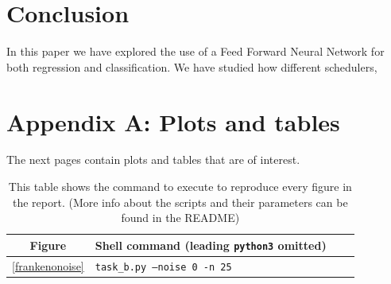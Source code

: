 \documentclass[onecolumn,10pt,cleanfoot]{asme2ej}
\begin{document}

\section{Conclusion}

In this paper we have explored the use of a Feed Forward Neural Network for both regression and classification. We have studied how different schedulers, 




\section*{Appendix A: Plots and tables}

The next pages contain plots and tables that are of interest.

\begin{table}
\caption{This table shows the command to execute to reproduce every figure in the report. (More info about the scripts and their parameters can be found in the README)}
\begin{center}
\label{allparamstable}
\begin{tabular}{c | l l l}
Figure & Shell command (leading \texttt{python3} omitted) \\
\hline
\ref{frankenonoise} & \texttt{task\_b.py --noise 0 -n 25}\\
\hline
\end{tabular}
\end{center}
\end{table}
\end{document}
